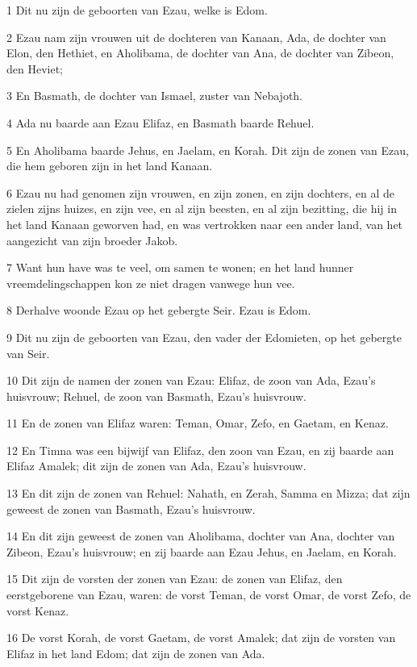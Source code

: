 \par 1 Dit nu zijn de geboorten van Ezau, welke is Edom.
\par 2 Ezau nam zijn vrouwen uit de dochteren van Kanaan, Ada, de dochter van Elon, den Hethiet, en Aholibama, de dochter van Ana, de dochter van Zibeon, den Heviet;
\par 3 En Basmath, de dochter van Ismael, zuster van Nebajoth.
\par 4 Ada nu baarde aan Ezau Elifaz, en Basmath baarde Rehuel.
\par 5 En Aholibama baarde Jehus, en Jaelam, en Korah. Dit zijn de zonen van Ezau, die hem geboren zijn in het land Kanaan.
\par 6 Ezau nu had genomen zijn vrouwen, en zijn zonen, en zijn dochters, en al de zielen zijns huizes, en zijn vee, en al zijn beesten, en al zijn bezitting, die hij in het land Kanaan geworven had, en was vertrokken naar een ander land, van het aangezicht van zijn broeder Jakob.
\par 7 Want hun have was te veel, om samen te wonen; en het land hunner vreemdelingschappen kon ze niet dragen vanwege hun vee.
\par 8 Derhalve woonde Ezau op het gebergte Seir. Ezau is Edom.
\par 9 Dit nu zijn de geboorten van Ezau, den vader der Edomieten, op het gebergte van Seir.
\par 10 Dit zijn de namen der zonen van Ezau: Elifaz, de zoon van Ada, Ezau's huisvrouw; Rehuel, de zoon van Basmath, Ezau's huisvrouw.
\par 11 En de zonen van Elifaz waren: Teman, Omar, Zefo, en Gaetam, en Kenaz.
\par 12 En Timna was een bijwijf van Elifaz, den zoon van Ezau, en zij baarde aan Elifaz Amalek; dit zijn de zonen van Ada, Ezau's huisvrouw.
\par 13 En dit zijn de zonen van Rehuel: Nahath, en Zerah, Samma en Mizza; dat zijn geweest de zonen van Basmath, Ezau's huisvrouw.
\par 14 En dit zijn geweest de zonen van Aholibama, dochter van Ana, dochter van Zibeon, Ezau's huisvrouw; en zij baarde aan Ezau Jehus, en Jaelam, en Korah.
\par 15 Dit zijn de vorsten der zonen van Ezau: de zonen van Elifaz, den eerstgeborene van Ezau, waren: de vorst Teman, de vorst Omar, de vorst Zefo, de vorst Kenaz.
\par 16 De vorst Korah, de vorst Gaetam, de vorst Amalek; dat zijn de vorsten van Elifaz in het land Edom; dat zijn de zonen van Ada.
